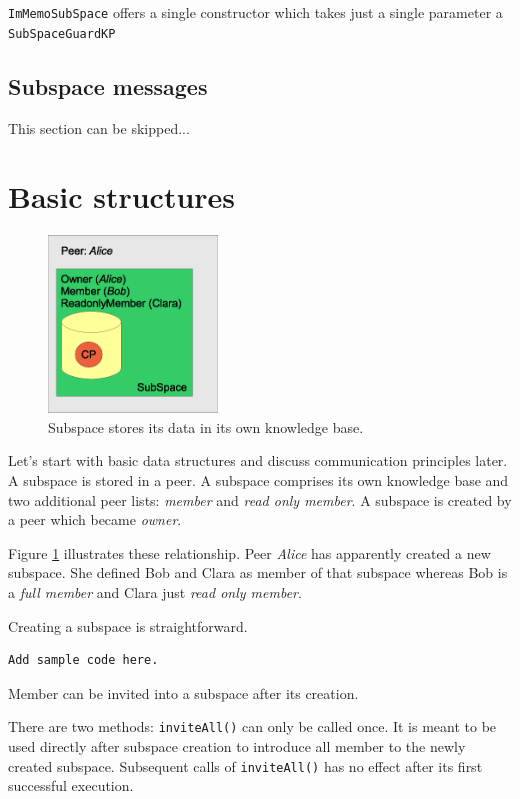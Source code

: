 {\tt ImMemoSubSpace} offers a single constructor which takes just a single parameter a {\tt SubSpaceGuardKP}

\subsection{Subspace messages}
\label{subspacemessages}
This section can be skipped...


\section{Basic structures}
\begin{figure}[t]
\centering
\includegraphics[width=0.40\textwidth]{subspace.eps}
\caption{Subspace stores its data in its own knowledge base.}
\label{fig:subspace}
\end{figure}

Let's start with basic data structures and discuss communication principles later. A subspace is stored in a peer. A subspace comprises its own knowledge base and two additional peer lists: {\it member} and {\it read only member}.
A subspace is created by a peer which became {\it owner}.

Figure \ref{fig:subspace} illustrates these relationship. Peer {\it Alice} has apparently created a new subspace. She defined Bob and Clara as member of that subspace whereas Bob is a {\it full member} and Clara just {\it read only member}.

Creating a subspace is straightforward.
\begin{verbatim}
Add sample code here.
\end{verbatim}

Member can be invited into a subspace after its creation.

There are two methods: {\verb|inviteAll()|} can only be called once. It is meant to be used directly after subspace creation to introduce all member to the newly created subspace. Subsequent calls of {\verb|inviteAll()|} has no effect after its first successful execution.

